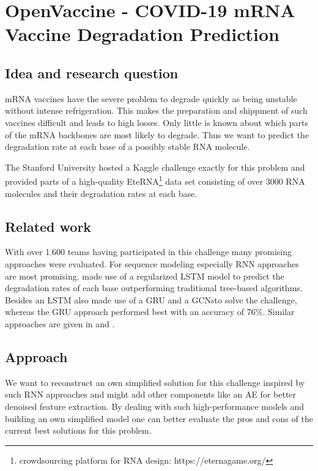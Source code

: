 \section{OpenVaccine - COVID-19 mRNA Vaccine Degradation Prediction} \label{proposal2}

\subsection{Idea and research question}

mRNA vaccines have the severe problem to degrade quickly as being unstable without intense refrigeration. This makes the preparation and shippment of such vaccines difficult and leads to high losses. Only little is known about which parts of the mRNA backbones are most likely to degrade. Thus we want to predict the degradation rate at each base of a possibly stable RNA molecule. 

The Stanford University hosted a Kaggle challenge exactly for this problem \cite{Kaggle2020} and provided parts of a high-quality EteRNA\footnote{crowdsourcing platform for RNA design: https://eternagame.org/} data set consisting of over 3000 RNA molecules and their degradation rates at each base.

\subsection{Related work}

With over 1.600 teams having participated in this challenge many promising approaches were evaluated. For sequence modeling especially \ac{RNN} approaches are most promising. \cite{Imran2021} made use of a regularized \ac{LSTM} model to predict the degradation rates of each base outperforming traditional tree-based algorithms. Besides an \ac{LSTM} \cite{Singhal2021} also made use of a \ac{GRU} and a \ac{GCN}sto solve the challenge, whereas the \ac{GRU} approach performed best with an accuracy of 76\%. Similar approaches are given in \cite{Qaid2021} and \cite{Vandewiele2020}. 

\subsection{Approach}

We want to reconstruct an own simplified solution for this challenge inspired by such \ac{RNN} approaches and might add other components like an \ac{AE} for better denoised feature extraction. By dealing with such high-performance models and building an own simplified model one can better evaluate the pros and cons of the current best solutions for this problem. 

